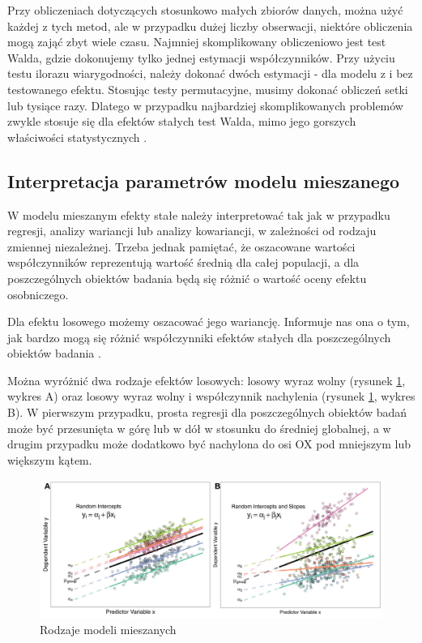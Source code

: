 \documentclass[12pt]{mwbk}
\theoremstyle{plain}
\theoremstyle{definition}
\theoremstyle{remark}
\newcommand\zrodlo[1]{\par\vspace{-3mm}{\small\textit{Źródło: }#1 }}
\begin{document}
Przy obliczeniach dotyczących stosunkowo małych zbiorów danych, można użyć każdej z tych metod, ale w przypadku dużej liczby obserwacji, niektóre obliczenia mogą zająć zbyt wiele czasu. Najmniej skomplikowany obliczeniowo jest test Walda, gdzie dokonujemy tylko jednej estymacji współczynników. Przy użyciu testu ilorazu wiarygodności, należy dokonać dwóch estymacji - dla modelu z i bez testowanego efektu. Stosując testy permutacyjne, musimy dokonać obliczeń setki lub tysiące razy. Dlatego w przypadku najbardziej skomplikowanych problemów zwykle stosuje się dla efektów stałych test Walda, mimo jego gorszych właściwości statystycznych \cite{biecek}.



\subsection{Interpretacja parametrów modelu mieszanego}
W modelu mieszanym efekty stałe należy interpretować tak jak w przypadku regresji, analizy wariancji lub analizy kowariancji, w zależności od rodzaju zmiennej niezależnej. Trzeba jednak pamiętać, że oszacowane wartości współczynników reprezentują wartość średnią dla całej populacji, a dla poszczególnych obiektów badania będą się różnić o wartość oceny efektu osobniczego.

Dla efektu losowego możemy oszacować jego wariancję. Informuje nas ona o tym, jak bardzo mogą się różnić współczynniki efektów stałych dla poszczególnych obiektów badania
\cite{experimental}.

Można wyróżnić dwa rodzaje efektów losowych: losowy wyraz wolny (rysunek \ref{fig:random_types}, wykres A) oraz losowy wyraz wolny i współczynnik nachylenia (rysunek \ref{fig:random_types}, wykres B). W pierwszym przypadku, prosta regresji dla poszczególnych obiektów badań może być przesunięta w górę lub w dół w stosunku do średniej globalnej, a w drugim przypadku może dodatkowo być nachylona do osi OX pod mniejszym lub większym kątem.

\begin{figure}[htbp]
	\centering
	\includegraphics[width=\linewidth]{rys/random_types.jpg}
	\caption{Rodzaje modeli mieszanych}
	\label{fig:random_types}
	\zrodlo{\cite{brief}}
\end{figure}
\end{document}
